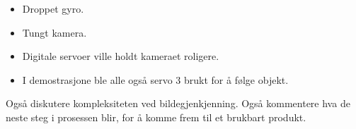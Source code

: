 \begin{itemize}
\item 
Droppet gyro.
\item 
Tungt kamera.
\item 
Digitale servoer ville holdt kameraet roligere.
\item
I demostrasjone  ble alle også servo 3 brukt for å følge objekt.
\end{itemize}

Også diskutere kompleksiteten ved bildegjenkjenning. 
Også kommentere hva de neste steg i prosessen blir, for å komme frem til et brukbart produkt. 

\subsection{}